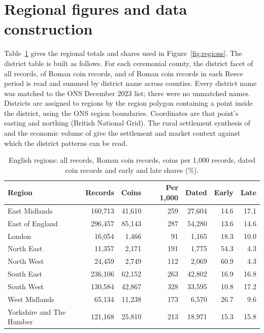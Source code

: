 \documentclass[11pt,a4paper]{article}
\begin{document}
\section{Regional figures and data construction}\label{sec:appx}
Table~\ref{tab:regions} gives the regional totals and shares used in Figure~\ref{fig:regions}. The district table is built as follows. For each ceremonial county, the district facet of all records, of Roman coin records, and of Roman coin records in each Reece period is read and summed by district name across counties. Every district name was matched to the ONS December 2023 list; there were no unmatched names. Districts are assigned to regions by the region polygon containing a point inside the district, using the ONS region boundaries. Coordinates are that point's easting and northing (British National Grid). The rural settlement synthesis of \citet{smith2016} and the economic volume of \citet{allen2017} give the settlement and market context against which the district patterns can be read.

\begin{table}[htbp]\centering\small\caption{English regions: all records, Roman coin records, coins per 1,000 records, dated coin records and early and late shares (\%).}\label{tab:regions}\begin{tabular}{lrrrrrr}\toprule Region & Records & Coins & Per 1,000 & Dated & Early & Late\\\midrule
East Midlands & 160,713 & 41,610 & 259 & 27,604 & 14.6 & 17.1\\
East of England & 296,457 & 85,143 & 287 & 54,280 & 13.6 & 14.6\\
London & 16,054 & 1,466 & 91 & 1,165 & 18.3 & 10.0\\
North East & 11,357 & 2,171 & 191 & 1,775 & 54.3 & 4.3\\
North West & 24,459 & 2,749 & 112 & 2,069 & 60.9 & 4.3\\
South East & 236,106 & 62,152 & 263 & 42,802 & 16.9 & 16.8\\
South West & 130,584 & 42,867 & 328 & 33,595 & 10.8 & 17.2\\
West Midlands & 65,134 & 11,238 & 173 & 6,570 & 26.7 & 9.6\\
Yorkshire and The Humber & 121,168 & 25,810 & 213 & 18,971 & 15.3 & 15.8\\
\bottomrule\end{tabular}\end{table}
\end{document}
